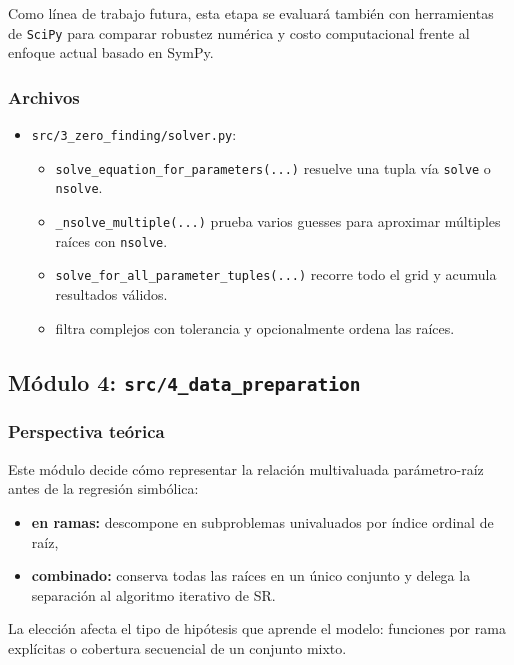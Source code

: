 \documentclass[12pt]{article}
\begin{document}
Como línea de trabajo futura, esta etapa se evaluará también con herramientas de \texttt{SciPy} para comparar robustez numérica y costo computacional frente al enfoque actual basado en SymPy.

\subsubsection*{Archivos}
\begin{itemize}[leftmargin=1.5em]
    \item \texttt{src/3\_zero\_finding/solver.py}:
    \begin{itemize}[leftmargin=1.5em]
        \item \texttt{solve\_equation\_for\_parameters(...)} resuelve una tupla vía \texttt{solve} o \texttt{nsolve}.
        \item \texttt{\_nsolve\_multiple(...)} prueba varios guesses para aproximar múltiples raíces con \texttt{nsolve}.
        \item \texttt{solve\_for\_all\_parameter\_tuples(...)} recorre todo el grid y acumula resultados válidos.
        \item filtra complejos con tolerancia y opcionalmente ordena las raíces.
    \end{itemize}
\end{itemize}

\subsection{Módulo 4: \texttt{src/4\_data\_preparation}}
\subsubsection*{Perspectiva teórica}
Este módulo decide cómo representar la relación multivaluada parámetro-raíz antes de la regresión simbólica:
\begin{itemize}[leftmargin=1.5em]
    \item \textbf{en ramas:} descompone en subproblemas univaluados por índice ordinal de raíz,
    \item \textbf{combinado:} conserva todas las raíces en un único conjunto y delega la separación al algoritmo iterativo de SR.
\end{itemize}

La elección afecta el tipo de hipótesis que aprende el modelo: funciones por rama explícitas o cobertura secuencial de un conjunto mixto.
\end{document}
